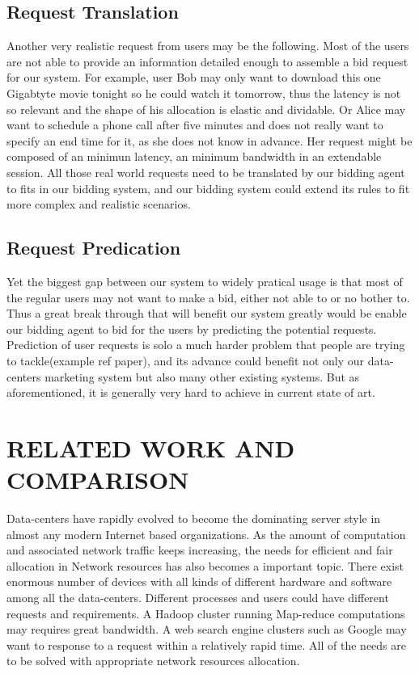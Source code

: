 \documentclass[a4paper,11pt,twocolumn]{article}
\begin{document}
\subsection{ Request Translation}
Another very realistic request from users may be the following. 
Most of the users are not able to provide an information detailed enough to assemble a bid request for our system. 
For example, user Bob may only want to download this one Gigabtyte movie tonight so he could watch it tomorrow, 
thus the latency is not so relevant and the shape of his allocation is elastic and dividable. Or 
Alice may want to schedule a phone call  after five minutes and does not really want to specify an end time for it, 
as she does not know in advance. Her request might be composed of an minimun latency, an minimum bandwidth in an extendable session. 
All those real world requests need to be translated by our bidding agent to fits in our bidding system, and our bidding system
 could extend its rules to fit more complex and realistic scenarios. 

\subsection{ Request Predication}
Yet the biggest gap between our system to widely pratical usage is that most of the regular users may not want to make a bid, 
either not able to or no bother to. Thus a great break through that will benefit our system greatly would be enable our bidding
 agent to bid for the users by predicting the potential requests.  Prediction of user requests is solo a much harder problem that 
people are trying to tackle(example ref paper), and its advance could benefit not only our data-centers marketing system but also many 
other existing systems. But as aforementioned, it is generally very hard to achieve in current state of art.



\section{RELATED WORK AND COMPARISON}
Data-centers have rapidly evolved to become the dominating server style in almost
any modern Internet based organizations. As the amount of computation and associated
network  traffic keeps increasing, the needs for efficient and fair  allocation in  Network resources
has also becomes a important topic. There exist enormous number of devices with all 
kinds of different hardware and software among all the data-centers. Different processes and users could
have different requests and requirements. A Hadoop cluster running Map-reduce computations 
may requires great bandwidth.
A web search engine clusters such as Google may want to response to a request 
within a relatively rapid time. All of the needs are to be solved with appropriate network resources
allocation.
\end{document}
